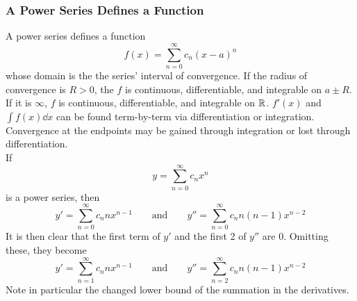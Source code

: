 \documentclass[./Differential Equations.tex]{subfiles}
\begin{document}
			\subsubsection*{A Power Series Defines a Function}
				A power series defines a function
						\[f(x) = \sum_{n = 0}^\infty c_n(x - a)^n\]
						whose domain is the the series' interval of convergence. If the radius of convergence is \(R > 0\), the \(f\) is continuous, differentiable, and integrable on \(a \pm R\). If it is \(\infty\), \(f\) is continuous, differentiable, and integrable on \(\mathbb{R}\). \(f'(x)\) and \(\int f(x)\dd{x}\) can be found term-by-term via differentiation or integration. Convergence at the endpoints may be gained through integration or lost through differentiation. \\
					If
						\[y = \sum_{n = 0}^\infty c_nx^n\]
						is a power series, then
						\[
							y' = \sum_{n = 0}^\infty c_nnx^{n - 1} \qquad \text{and} \qquad
							y'' = \sum_{n = 0}^\infty c_nn(n - 1)x^{n - 2}
						\]
						It is then clear that the first term of \(y'\) and the first 2 of \(y''\) are 0. Omitting these, they become
						\[
							y' = \sum_{n = 1}^\infty c_nnx^{n - 1} \qquad \text{and} \qquad
							y'' = \sum_{n = 2}^\infty c_nn(n - 1)x^{n - 2}
						\]
						Note in particular the changed lower bound of the summation in the derivatives.
\end{document}
